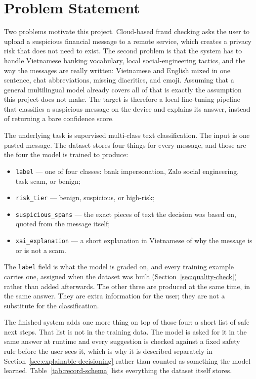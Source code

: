 \section{Problem Statement}
\label{sec:problem-statement}
Two problems motivate this project. Cloud-based fraud checking asks the user to upload a suspicious financial message to a remote service, which creates a privacy risk that does not need to exist. The second problem is that the system has to handle Vietnamese banking vocabulary, local social-engineering tactics, and the way the messages are really written: Vietnamese and English mixed in one sentence, chat abbreviations, missing diacritics, and emoji. Assuming that a general multilingual model already covers all of that is exactly the assumption this project does not make. The target is therefore a local fine-tuning pipeline that classifies a suspicious message on the device and explains its answer, instead of returning a bare confidence score.

The underlying task is supervised multi-class text classification. The input is one pasted message. The dataset stores four things for every message, and those are the four the model is trained to produce:

\begin{itemize}\itemsep2pt
\item \texttt{label} --- one of four classes: bank impersonation, Zalo social engineering, task scam, or benign;
\item \texttt{risk\_tier} --- benign, suspicious, or high-risk;
\item \texttt{suspicious\_spans} --- the exact pieces of text the decision was based on, quoted from the message itself;
\item \texttt{xai\_explanation} --- a short explanation in Vietnamese of why the message is or is not a scam.
\end{itemize}

\noindent The \texttt{label} field is what the model is graded on, and every training example carries one, assigned when the dataset was built (Section~\ref{sec:quality-check}) rather than added afterwards. The other three are produced at the same time, in the same answer. They are extra information for the user; they are not a substitute for the classification.

The finished system adds one more thing on top of those four: a short list of safe next steps. That list is not in the training data. The model is asked for it in the same answer at runtime and every suggestion is checked against a fixed safety rule before the user sees it, which is why it is described separately in Section~\ref{sec:explainable-decisioning} rather than counted as something the model learned. Table~\ref{tab:record-schema} lists everything the dataset itself stores.

